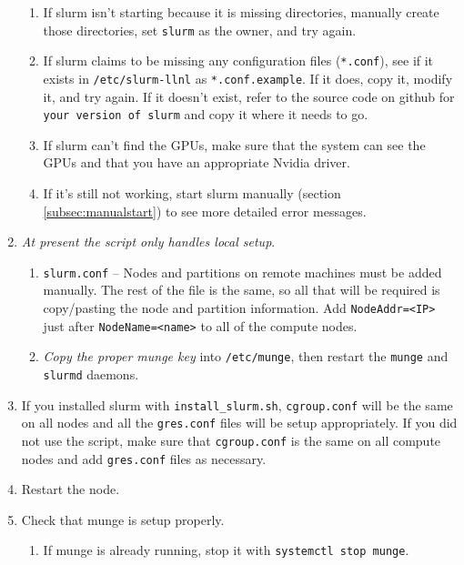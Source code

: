 \begin{enumerate}
\begin{enumerate}
      \item If slurm isn't starting because it is missing directories, manually create those directories, set \texttt{slurm} as the owner, and try again.

      \item If slurm claims to be missing any configuration files (\texttt{*.conf}), see if it exists in \texttt{/etc/slurm-llnl} as \texttt{*.conf.example}. If it does, copy it, modify it, and try again. If it doesn't exist, refer to the source code on github for \texttt{your version of slurm} and copy it where it needs to go.

      \item If slurm can't find the GPUs, make sure that the system can see the GPUs and that you have an appropriate Nvidia driver.

      \item If it's still not working, start slurm manually (section \ref{subsec:manualstart}) to see more detailed error messages. 
    \end{enumerate}

  \item \emph{At present the script only handles local setup}. 

    \begin{enumerate}
      \item \texttt{slurm.conf} -- Nodes and partitions on remote machines must be added manually. The rest of the file is the same, so all that will be required is copy/pasting the node and partition information. Add \texttt{NodeAddr=<IP>} just after \texttt{NodeName=<name>} to all of the compute nodes.

      \item \emph{Copy the proper munge key} into \texttt{/etc/munge}, then restart the \texttt{munge} and \texttt{slurmd} daemons.
    \end{enumerate}

  \item If you installed slurm with \texttt{install\_slurm.sh}, \texttt{cgroup.conf} will be the same on all nodes and all the \texttt{gres.conf} files will be setup appropriately. If you did not use the script, make sure that \texttt{cgroup.conf} is the same on all compute nodes and add \texttt{gres.conf} files as necessary.

  \item Restart the node.

  \item Check that munge is setup properly. \label{list:munge}
    \begin{enumerate}
      \item If munge is already running, stop it with \texttt{systemctl stop munge}.


\end{enumerate}
\end{enumerate}
